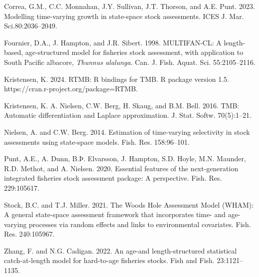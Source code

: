 \documentclass{SCreport}
\begin{document}
\begin{description}\setlength\itemsep{0ex}
  \item Correa, G.M., C.C. Monnahan, J.Y. Sullivan, J.T. Thorson, and A.E. Punt.
  2023. Modelling time-varying growth in state-space stock assessments. ICES J.
  Mar. Sci.80:2036--2049.
  \item Fournier, D.A., J. Hampton, and J.R. Sibert. 1998. MULTIFAN-CL: A
  length-based, age-structured model for fisheries stock assessment, with
  application to South Pacific albacore, \textit{Thunnus alalunga}. Can. J.
  Fish. Aquat. Sci. 55:2105--2116.
  \item Kristensen, K. 2024. RTMB: R bindings for TMB. R package version 1.5.\\
  https://cran.r-project.org/package=RTMB.
  \item Kristensen, K. A. Nielsen, C.W. Berg, H. Skaug, and B.M. Bell. 2016.
  TMB: Automatic differentiation and Laplace approximation. J. Stat. Softw.
  70(5):1--21.
  \item Nielsen, A. and C.W. Berg. 2014. Estimation of time-varying selectivity
  in stock assessments using state-space models. Fish. Res. 158:96--101.
  \item Punt, A.E., A. Dunn, B.Þ. Elvarsson, J. Hampton, S.D. Hoyle, M.N.
  Maunder, R.D. Methot, and A. Nielsen. 2020. Essential features of the
  next-generation integrated fisheries stock assessment package: A perspective.
  Fish. Res. 229:105617.
  \item Stock, B.C. and T.J. Miller. 2021. The Woods Hole Assessment Model
  (WHAM): A general state-space assessment framework that incorporates time- and
  age-varying processes via random effects and links to environmental
  covariates. Fish. Res. 240:105967.
  \item Zhang, F. and N.G. Cadigan. 2022. An age-and length-structured
  statistical catch-at-length model for hard-to-age fisheries stocks. Fish and
  Fish. 23:1121--1135.
\end{description}
\end{document}
